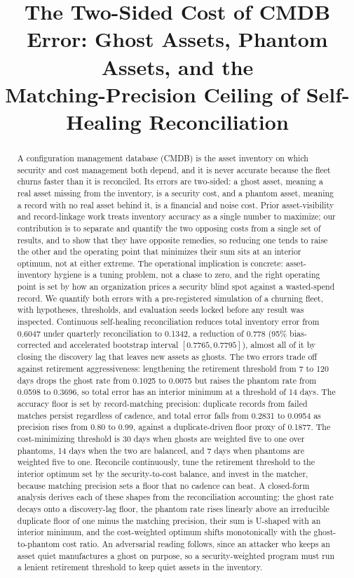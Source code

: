\documentclass[journal]{IEEEtran}
\title{The Two-Sided Cost of CMDB Error: Ghost Assets, Phantom Assets, and the\\
Matching-Precision Ceiling of Self-Healing Reconciliation}
\author{%
  \IEEEauthorblockN{Harshavardhan Malla}
  \IEEEauthorblockA{Independent Researcher\\ Email: harshavardhanmalla75@gmail.com}%
}
\begin{document}
\maketitle

\begin{abstract}
A configuration management database (CMDB) is the asset inventory on which security and cost management
both depend, and it is never accurate because the fleet churns faster than it is reconciled. Its
errors are two-sided: a ghost asset, meaning a real asset missing from the inventory, is a security
cost, and a phantom asset, meaning a record with no real asset behind it, is a financial and noise
cost. Prior asset-visibility and record-linkage work treats inventory accuracy as a single number to
maximize; our contribution is to separate and quantify the two opposing costs from a single set of
results, and to show that they have opposite remedies, so reducing one tends to raise the other and
the operating point that minimizes their sum sits at an interior optimum, not at either extreme.
The operational implication is concrete: asset-inventory hygiene is a tuning problem, not a chase to
zero, and the right operating point is set by how an organization prices a security blind spot against
a wasted-spend record. We quantify both errors with a
pre-registered simulation of a churning fleet, with hypotheses, thresholds, and evaluation seeds
locked before any result was inspected. Continuous self-healing reconciliation reduces total
inventory error from 0.6047 under quarterly reconciliation to 0.1342, a reduction of 0.778 (95\%
bias-corrected and accelerated bootstrap interval $[0.7765, 0.7795]$), almost all of it by closing
the discovery lag that leaves new assets as ghosts. The two errors trade off against retirement
aggressiveness: lengthening the retirement threshold from 7 to 120 days drops the ghost rate from
0.1025 to 0.0075 but raises the phantom rate from 0.0598 to 0.3696, so total error has an interior
minimum at a threshold of 14 days. The accuracy floor is set by record-matching precision:
duplicate records from failed matches persist regardless of cadence, and total error falls from
0.2831 to 0.0954 as precision rises from 0.80 to 0.99, against a duplicate-driven floor proxy of
0.1877. The cost-minimizing threshold is 30 days when ghosts are weighted five to one over phantoms,
14 days when the two are balanced, and 7 days when phantoms are weighted five to one. Reconcile
continuously, tune the retirement threshold to the interior optimum set by the security-to-cost
balance, and invest in the matcher, because matching precision sets a floor that no cadence can beat.
A closed-form analysis derives each of these shapes from the reconciliation accounting: the ghost rate
decays onto a discovery-lag floor, the phantom rate rises linearly above an irreducible duplicate floor
of one minus the matching precision, their sum is U-shaped with an interior minimum, and the
cost-weighted optimum shifts monotonically with the ghost-to-phantom cost ratio. An adversarial reading
follows, since an attacker who keeps an asset quiet manufactures a ghost on purpose, so a
security-weighted program must run a lenient retirement threshold to keep quiet assets in the inventory.
\end{abstract}
\end{document}
